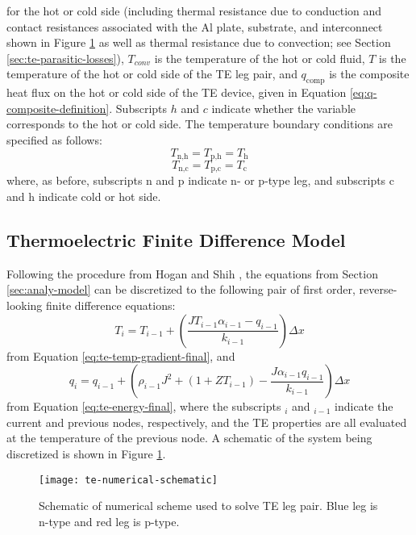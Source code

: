 \documentclass[preprint,authoryear,12pt]{elsarticle}
\begin{document}
for the hot or cold side (including thermal resistance due to
conduction and contact resistances associated with the Al plate,
substrate, and interconnect shown in Figure
\ref{fig:te-numerical-schematic} as well as thermal resistance due to
convection; see Section \ref{sec:te-parasitic-losses}), $T_{conv}$ is
the temperature of the hot or cold fluid, $T$ is the temperature of
the hot or cold side of the TE leg pair, and $q_{\text{comp}}$ is the
composite heat flux on the hot or cold side of the TE device, given in
Equation \ref{eq:q-composite-definition}.  Subscripts $h$ and $c$
indicate whether the variable corresponds to the hot or cold side.
The temperature boundary conditions are specified as follows:
\begin{equation}
  \label{eq:TE-hot-ana-T}
  T_{\text{n,h}} = T_{\text{p,h}} = T_\text{h}
\end{equation}
\begin{equation}
  \label{eq:TE-cold-ana-T}
  T_{\text{n,c}} = T_{\text{p,c}} = T_\text{c}
\end{equation}
where, as before, subscripts n and p indicate n- or p-type leg, and
subscripts c and h indicate cold or hot side.

\subsection{Thermoelectric Finite Difference Model}
\label{sec:te_finite}

Following the procedure from Hogan and Shih
\cite{hogan_modeling_2006}, the equations from Section
\ref{sec:analy-model} can be discretized to the following pair of
first order, reverse-looking finite difference equations:
\begin{equation}
  \label{eq:temp-discrete}
  T_i = T_{i-1} + \left( \frac{J T_{i-1} \alpha_{i-1} -q_{i-1}}{k
     _{i-1}} \right) \Delta x  
\end{equation}
from Equation \ref{eq:te-temp-gradient-final}, and
\begin{equation}
  \label{eq:q-discrete}
  q_i = q_{i-1} + \left( \rho_{i-1} J^2 + \left( 1 + ZT_{i-1} \right) - \frac{J
      \alpha_{i-1} q_{i-1}}{k_{i-1}} \right) \Delta x
\end{equation}
from Equation \ref{eq:te-energy-final}, where the subscripts $_i$
and $_{i-1}$ indicate the current and previous nodes, respectively,
and the TE properties are all evaluated at the temperature of the
previous node.  A schematic of the system being discretized is shown
in Figure \ref{fig:te-numerical-schematic}.
\begin{figure}[H]
  \centering
  \texttt{[image: te-numerical-schematic]}
  \caption{Schematic of numerical scheme used to solve TE leg pair.
    Blue leg is n-type and red leg is p-type.}
  \label{fig:te-numerical-schematic}
\end{figure}
\end{document}
